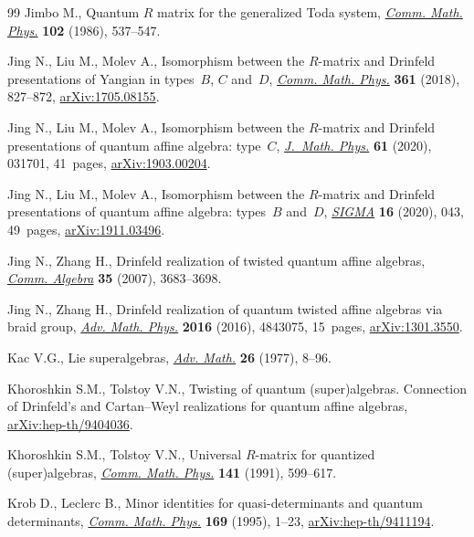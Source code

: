 \documentclass[pdftex]{sigma}
\numberwithin{equation}{section}
\begin{document}
\begin{thebibliography}{99}
Jimbo M., Quantum {$R$} matrix for the generalized {T}oda system, \href{https://doi.org/10.1007/BF01221646}{\textit{Comm.
 Math. Phys.}} \textbf{102} (1986), 537--547.

Jing N., Liu M., Molev A., Isomorphism between the $R$-matrix and Drinfeld
 presentations of {Y}angian in types~$B$, $C$ and~$D$, \href{https://doi.org/10.1007/s00220-018-3185-x}{\textit{Comm. Math.
 Phys.}} \textbf{361} (2018), 827--872, \href{https://arxiv.org/abs/1705.08155}{arXiv:1705.08155}.

Jing N., Liu M., Molev A., Isomorphism between the {$R$}-matrix and {D}rinfeld
 presentations of quantum affine algebra: type~{$C$}, \href{https://doi.org/10.1063/1.5133854}{\textit{J.~Math. Phys.}}
 \textbf{61} (2020), 031701, 41~pages, \href{https://arxiv.org/abs/1903.00204}{arXiv:1903.00204}.

Jing N., Liu M., Molev A., Isomorphism between the $R$-matrix and {D}rinfeld
 presentations of quantum affine algebra: types~$B$ and~$D$, \href{https://doi.org/10.3842/SIGMA.2020.043}{\textit{SIGMA}}
 \textbf{16} (2020), 043, 49~pages, \href{https://arxiv.org/abs/1911.03496}{arXiv:1911.03496}.

Jing N., Zhang H., Drinfeld realization of twisted quantum affine algebras,
 \href{https://doi.org/10.1080/00927870701404713}{\textit{Comm. Algebra}} \textbf{35} (2007), 3683--3698.

Jing N., Zhang H., Drinfeld realization of quantum twisted affine algebras via
 braid group, \href{https://doi.org/10.1155/2016/4843075}{\textit{Adv. Math. Phys.}} \textbf{2016} (2016), 4843075,
 15~pages, \href{https://arxiv.org/abs/1301.3550}{arXiv:1301.3550}.

Kac V.G., Lie superalgebras, \href{https://doi.org/10.1016/0001-8708(77)90017-2}{\textit{Adv. Math.}} \textbf{26} (1977), 8--96.

Khoroshkin S.M., Tolstoy V.N., Twisting of quantum (super)algebras.
 {C}onnection of {D}rinfeld's and {C}artan--{W}eyl realizations for quantum
 affine algebras, \href{https://arxiv.org/abs/hep-th/9404036}{arXiv:hep-th/9404036}.

Khoroshkin S.M., Tolstoy V.N., Universal {$R$}-matrix for quantized
 (super)algebras, \href{https://doi.org/10.1007/BF02102819}{\textit{Comm. Math. Phys.}} \textbf{141} (1991), 599--617.

Krob D., Leclerc B., Minor identities for quasi-determinants and quantum
 determinants, \href{https://doi.org/10.1007/BF02101594}{\textit{Comm. Math. Phys.}} \textbf{169} (1995), 1--23,
 \href{https://arxiv.org/abs/hep-th/9411194}{arXiv:hep-th/9411194}.


\end{thebibliography}
\end{document}
